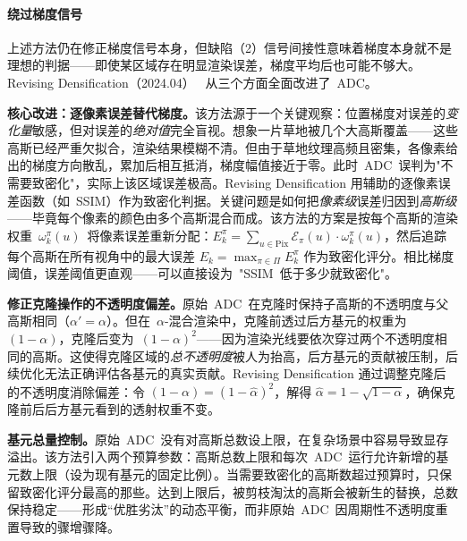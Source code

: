 \paragraph{绕过梯度信号}

上述方法仍在修正梯度信号本身，但缺陷（2）信号间接性意味着梯度本身就不是理想的判据——即使某区域存在明显渲染误差，梯度平均后也可能不够大。Revising Densification（2024.04）~\cite{2404_06109} 从三个方面全面改进了~ADC。

\textbf{核心改进：逐像素误差替代梯度。}该方法源于一个关键观察：位置梯度对误差的\emph{变化量}敏感，但对误差的\emph{绝对值}完全盲视。想象一片草地被几个大高斯覆盖——这些高斯已经严重欠拟合，渲染结果模糊不清。但由于草地纹理高频且密集，各像素给出的梯度方向散乱，累加后相互抵消，梯度幅值接近于零。此时~ADC~误判为"不需要致密化"，实际上该区域误差极高。Revising Densification 用辅助的逐像素误差函数（如~SSIM）作为致密化判据。关键问题是如何把\emph{像素级}误差归因到\emph{高斯级}——毕竟每个像素的颜色由多个高斯混合而成。该方法的方案是按每个高斯的渲染权重~$\omega_k^\pi(u)$~将像素误差重新分配：$E_k^\pi = \sum_{u \in \text{Pix}} \mathcal{E}_\pi(u) \cdot \omega_k^\pi(u)$，然后追踪每个高斯在所有视角中的最大误差 $E_k = \max_{\pi \in \Pi} E_k^\pi$ 作为致密化评分。相比梯度阈值，误差阈值更直观——可以直接设为~"SSIM~低于多少就致密化"。

\textbf{修正克隆操作的不透明度偏差。}原始~ADC~在克隆时保持子高斯的不透明度与父高斯相同（$\alpha' = \alpha$）。但在~$\alpha$-混合渲染中，克隆前透过后方基元的权重为~$(1{-}\alpha)$，克隆后变为~$(1{-}\alpha)^2$——因为渲染光线要依次穿过两个不透明度相同的高斯。这使得克隆区域的\emph{总不透明度}被人为抬高，后方基元的贡献被压制，后续优化无法正确评估各基元的真实贡献。Revising Densification 通过调整克隆后的不透明度消除偏差：令 $(1{-}\alpha) = (1{-}\hat{\alpha})^2$，解得 $\hat{\alpha} = 1{-}\sqrt{1{-}\alpha}$，确保克隆前后后方基元看到的透射权重不变。

\textbf{基元总量控制。}原始~ADC~没有对高斯总数设上限，在复杂场景中容易导致显存溢出。该方法引入两个预算参数：高斯总数上限和每次~ADC~运行允许新增的基元数上限（设为现有基元的固定比例）。当需要致密化的高斯数超过预算时，只保留致密化评分最高的那些。达到上限后，被剪枝淘汰的高斯会被新生的替换，总数保持稳定——形成``优胜劣汰''的动态平衡，而非原始~ADC~因周期性不透明度重置导致的骤增骤降。

